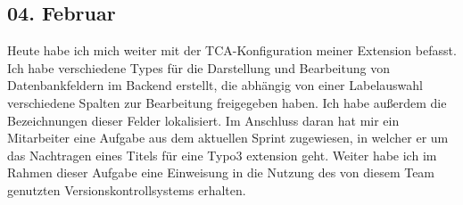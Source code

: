 \subsection{04. Februar}
Heute habe ich mich weiter mit der TCA-Konfiguration meiner Extension befasst. Ich habe verschiedene Types für die Darstellung und Bearbeitung von Datenbankfeldern im Backend erstellt, die abhängig von einer Labelauswahl verschiedene Spalten zur Bearbeitung freigegeben haben. Ich habe außerdem die Bezeichnungen dieser Felder lokalisiert. Im Anschluss daran hat mir ein Mitarbeiter eine Aufgabe aus dem aktuellen Sprint zugewiesen, in welcher er um das Nachtragen eines Titels für eine Typo3 extension geht. Weiter habe ich im Rahmen dieser Aufgabe eine Einweisung in die Nutzung des von diesem Team genutzten Versionskontrollsystems erhalten.